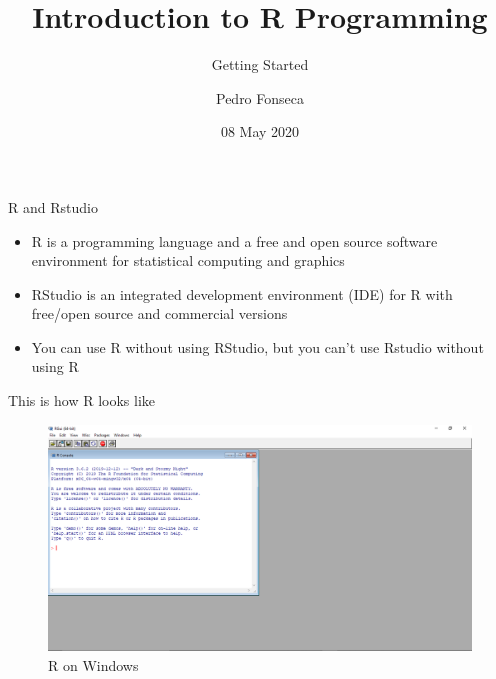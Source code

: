 \documentclass[ignorenonframetext,]{beamer}
\title{Introduction to R Programming}
\subtitle{Getting Started}
\author{Pedro Fonseca}
\date{08 May 2020}
\begin{document}
\frame{\titlepage}

\begin{frame}{R and Rstudio}
\protect\hypertarget{r-and-rstudio}{}

\begin{itemize}
\item
  R is a programming language and a free and open source software
  environment for statistical computing and graphics
\item
  RStudio is an integrated development environment (IDE) for R with
  free/open source and commercial versions
\item
  You can use R without using RStudio, but you can't use Rstudio without
  using R
\end{itemize}

\end{frame}

\begin{frame}{This is how R looks like}
\protect\hypertarget{this-is-how-r-looks-like}{}

\begin{figure}
\includegraphics[scale = .3]{figures/Screenshot_1}
\caption{R on Windows}
\end{figure}

\end{frame}
\end{document}
